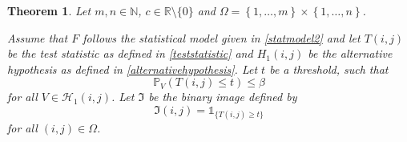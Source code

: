 \documentclass[a4paper,12pt]{article}
\theoremstyle{plain}
\newtheorem{theorem}{Theorem}[section]
\theoremstyle{definition}
\begin{document}
\begin{appendix}
%	
%	
%	
	
	\begin{theorem}
		Let $m, n \in \mathbb{N}$, $c \in \mathbb{R} \setminus \{ 0 \}$ and $\Omega = \left\{ 1, \dots, m \right\} \times \left\{ 1, \dots, n \right\}$.
		
		Assume that $F$ follows the statistical model given in \eqref{statmodel2} and let $T(i, j)$ be the test statistic as defined in \eqref{teststatistic} and $H_1(i, j)$ be the alternative hypothesis as defined in \eqref{alternativehypothesis}. Let $t$ be a threshold, such that
		\begin{equation*}
			\mathbb{P}_V\left( T(i, j) \leq t \right) \leq \beta
		\end{equation*}
		for all $V \in \mathcal{H}_1(i, j)$. Let $\mathfrak{I}$ be the binary image defined by
		\begin{equation}
			\mathfrak{I}(i, j) = \mathds{1}_{ \{ T(i, j) \geq t \} }
		\end{equation}
		for all $(i, j) \in \Omega$.
		

\end{theorem}
\end{appendix}
\end{document}
